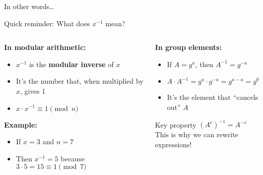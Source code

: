 \documentclass[aspectratio=169, lualatex, handout]{beamer}
\begin{document}
\begin{frame}{In other words\ldots}
	\begin{center}
	\end{center}
\end{frame}

\begin{frame}{Quick reminder: What does $x^{-1}$ mean?}
	\begin{columns}[c]
		\begin{column}{0.5\textwidth}
			\textbf{In modular arithmetic:}
			\begin{itemize}
				\item $x^{-1}$ is the \textbf{modular inverse} of $x$
				\item It's the number that, when multiplied by $x$, gives 1
				\item $x \cdot x^{-1} \equiv 1 \pmod{n}$
			\end{itemize}
			\textbf{Example:}
			\begin{itemize}
				\item If $x = 3$ and $n = 7$
				\item Then $x^{-1} = 5$ because $3 \cdot 5 = 15 \equiv 1 \pmod{7}$
			\end{itemize}
		\end{column}
		\begin{column}{0.5\textwidth}
			\textbf{In group elements:}
			\begin{itemize}
				\item If $A = g^a$, then $A^{-1} = g^{-a}$
				\item $A \cdot A^{-1} = g^a \cdot g^{-a} = g^{a-a} = g^0 = 1$
				\item It's the element that ``cancels out'' $A$
			\end{itemize}
			\begin{alertblock}{Key property}
				$(A^c)^{-1} = A^{-c}$ \\
				This is why we can rewrite expressions!
			\end{alertblock}
		\end{column}
	\end{columns}
\end{frame}
\end{document}
